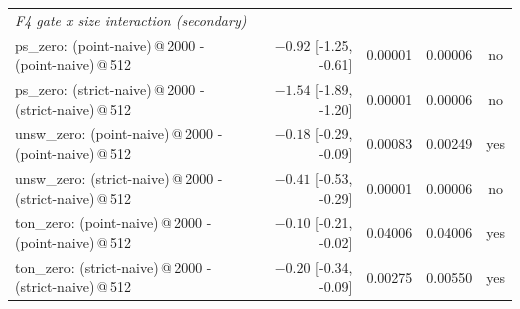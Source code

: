 \begin{table}
\begin{tabular}{l r r r c}
\multicolumn{5}{l}{\emph{F4 gate x size interaction (secondary)}} \\
ps\_zero: (point-naive)\,@\,2000 - (point-naive)\,@\,512 & $-0.92$ [-1.25, -0.61] & 0.00001 & 0.00006 & no \\
ps\_zero: (strict-naive)\,@\,2000 - (strict-naive)\,@\,512 & $-1.54$ [-1.89, -1.20] & 0.00001 & 0.00006 & no \\
unsw\_zero: (point-naive)\,@\,2000 - (point-naive)\,@\,512 & $-0.18$ [-0.29, -0.09] & 0.00083 & 0.00249 & yes \\
unsw\_zero: (strict-naive)\,@\,2000 - (strict-naive)\,@\,512 & $-0.41$ [-0.53, -0.29] & 0.00001 & 0.00006 & no \\
ton\_zero: (point-naive)\,@\,2000 - (point-naive)\,@\,512 & $-0.10$ [-0.21, -0.02] & 0.04006 & 0.04006 & yes \\
ton\_zero: (strict-naive)\,@\,2000 - (strict-naive)\,@\,512 & $-0.20$ [-0.34, -0.09] & 0.00275 & 0.00550 & yes \\
\bottomrule
\end{tabular}
\end{table}

